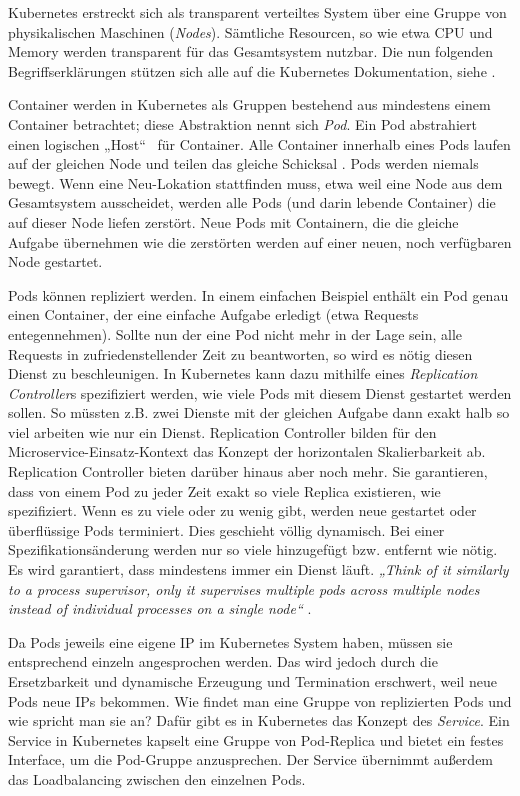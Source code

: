 Kubernetes erstreckt sich als transparent verteiltes System über eine Gruppe von physikalischen Maschinen (\textit{Nodes}). Sämtliche Resourcen, so wie etwa CPU und Memory werden transparent für das Gesamtsystem nutzbar. Die nun folgenden Begriffserklärungen stützen sich alle auf die Kubernetes Dokumentation, siehe \cite{k8sdoc}.

Container werden in Kubernetes als Gruppen bestehend aus mindestens einem Container betrachtet; diese Abstraktion nennt sich \textit{Pod}. Ein Pod abstrahiert einen logischen „Host“ \ für Container. Alle Container innerhalb eines Pods laufen auf der gleichen Node und teilen das gleiche Schicksal \cite{k8sdoc}. Pods werden niemals bewegt. Wenn eine Neu-Lokation stattfinden muss, etwa weil eine Node aus dem Gesamtsystem ausscheidet, werden alle Pods (und darin lebende Container) die auf dieser Node liefen zerstört. Neue Pods mit Containern, die die gleiche Aufgabe übernehmen wie die zerstörten werden auf einer neuen, noch verfügbaren Node gestartet. 

Pods können repliziert werden. In einem einfachen Beispiel enthält ein Pod genau einen Container, der eine einfache Aufgabe erledigt (etwa Requests entegennehmen). Sollte nun der eine Pod nicht mehr in der Lage sein, alle Requests in zufriedenstellender Zeit zu beantworten, so wird es nötig diesen Dienst zu beschleunigen. In Kubernetes kann dazu mithilfe eines \textit{Replication Controller}s spezifiziert werden, wie viele Pods mit diesem Dienst gestartet werden sollen. So müssten z.B. zwei Dienste mit der gleichen Aufgabe dann exakt halb so viel arbeiten wie nur ein Dienst. Replication Controller bilden für den Microservice-Einsatz-Kontext das Konzept der horizontalen Skalierbarkeit ab. Replication Controller bieten darüber hinaus aber noch mehr. Sie garantieren, dass von einem Pod zu jeder Zeit exakt so viele Replica existieren, wie spezifiziert. Wenn es zu viele oder zu wenig gibt, werden neue gestartet oder überflüssige Pods terminiert. Dies geschieht völlig dynamisch. Bei einer Spezifikationsänderung werden nur so viele hinzugefügt bzw. entfernt wie nötig. Es wird garantiert, dass mindestens immer ein Dienst läuft. \textit{„Think of it similarly to a process supervisor, only it supervises multiple pods across multiple nodes instead of individual processes on a single node“} \cite{k8sdoc}.

Da Pods jeweils eine eigene IP im Kubernetes System haben, müssen sie entsprechend einzeln angesprochen werden. Das wird jedoch durch die Ersetzbarkeit und dynamische Erzeugung und Termination erschwert, weil neue Pods neue IPs bekommen. Wie findet man eine Gruppe von replizierten Pods und wie spricht man sie an? Dafür gibt es in Kubernetes das Konzept des \textit{Service}. Ein Service in Kubernetes kapselt eine Gruppe von Pod-Replica und bietet ein festes Interface, um die Pod-Gruppe anzusprechen. Der Service übernimmt außerdem das Loadbalancing zwischen den einzelnen Pods.

